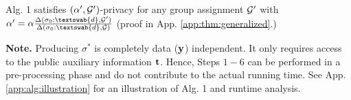 \begin{thm} Alg. 1 satisfies 
$(\alpha',\mathcal{G}')$-\name privacy for any group assignment $\mathcal{G}'$ with $ \alpha'=\alpha\frac{\Delta(\sigma_0 : \textswab{d}, \calG')}{\Delta(\sigma_0 : \textswab{d}, \calG)}$ (proof in App. \ref{app:thm:generalized}.) %
 \vspace{-0.2cm}
\label{thm:generalized:privacy}
\end{thm} 




\textbf{Note.} Producing $\sigma^*$ is completely data ($\mathbf{y}$) independent. It only requires access to the public auxiliary information $\mathbf{t}$. Hence, Steps $1-6$ can be performed in a pre-processing phase and do not contribute to the actual running time. See App. \ref{app:alg:illustration} for an illustration of Alg. 1 and runtime analysis. \nocite{RIM}